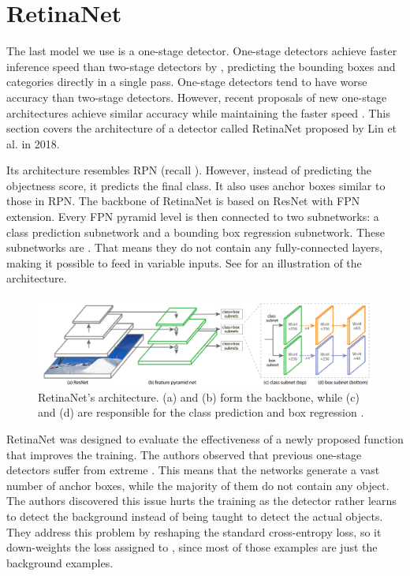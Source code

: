 \section{RetinaNet}
The last model we use is a one-stage detector. One-stage detectors achieve
faster inference speed than two-stage detectors by , predicting the bounding boxes and categories directly
in a single pass. One-stage detectors tend to have worse accuracy than
two-stage detectors.  However, recent proposals of new one-stage architectures
achieve similar accuracy while maintaining the faster speed \cite{retinanet,
    yolo3}. This section covers the architecture of a detector called RetinaNet
proposed by Lin et al. in 2018.

Its architecture resembles RPN (recall ). However, instead
of predicting the objectness score, it predicts the final class. It also uses
anchor boxes similar to those in RPN. The backbone of RetinaNet is based on
ResNet with FPN extension. Every FPN pyramid level is then connected to two
subnetworks: a class prediction subnetwork and a bounding box regression
subnetwork. These subnetworks are . That means
they do not contain any fully-connected layers, making it possible to feed
in variable inputs. See  for an illustration
of the architecture.

\begin{figure}[h]
    \centering
    \includegraphics[width=\linewidth]{Sources/Figures/retinanet.png}
    \caption{RetinaNet's architecture. (a) and (b) form the backbone, while (c)
        and (d) are responsible for the class prediction and box regression
        \cite{retinanet}.}
    \label{fig:retinanet}
\end{figure}

RetinaNet was designed to evaluate the effectiveness of a newly proposed
 function that improves the training. The authors observed that
previous one-stage detectors \cite{yolo1, yolo2, ssd} suffer from extreme
. This means that the networks
generate a vast number of anchor boxes, while the majority of them do not
contain any object. The authors discovered this issue hurts the training as the
detector rather learns to detect the background instead of being taught to
detect the actual objects. They address this problem by reshaping the standard
cross-entropy loss, so it down-weights the loss assigned to
, since most of those examples are just the
background examples.

